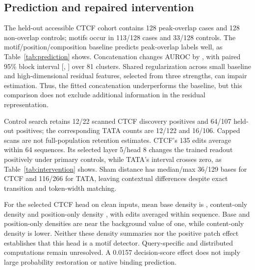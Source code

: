 \documentclass[10pt,letterpaper]{article}
\begin{document}
\subsection{Prediction and repaired intervention}
The held-out accessible CTCF cohort contains 128 peak-overlap cases and 128 non-overlap controls; motifs occur in 113/128 cases and 33/128 controls. The motif/position/composition baseline predicts peak-overlap labels well, as Table~\ref{tab:prediction} shows. Concatenation changes AUROC by \IncrementalMean{}, with paired 95\% block interval [\IncrementalLow{}, \IncrementalHigh{}] over 81 clusters. Shared regularization across small baseline and high-dimensional residual features, selected from three strengths, can impair estimation. Thus, the fitted concatenation underperforms the baseline, but this comparison does not exclude additional information in the residual representation.
\begin{table}[t]\centering\setlength{\tabcolsep}{4pt}
\caption{Accessible CTCF prediction on fixed held-out membership. Marginal sequence-bootstrap intervals condition on fitted classifiers; the paired difference uses blocks.}
\label{tab:prediction}\end{table}

Control search retains 12/22 scanned CTCF discovery positives and 64/107 held-out positives; the corresponding TATA counts are 12/122 and 16/106. Capped scans are not full-population retention estimates. CTCF's 135 edits average within 64 sequences. Its selected layer 5/head 8 changes the trained readout positively under primary controls, while TATA's interval crosses zero, as Table~\ref{tab:intervention} shows. Sham distance has median/max 36/129 bases for CTCF and 116/266 for TATA, leaving contextual differences despite exact transition and token-width matching.
\begin{table}[t]\centering\setlength{\tabcolsep}{3pt}
\caption{Fixed-head trained-readout intervention on held-out chromosomes. Effects are sequence-weighted motif-minus-sham decision-score changes; 95\% intervals and primary p-values use blocks. Indices are zero-based.}
\label{tab:intervention}\end{table}

For the selected CTCF head on clean inputs, mean base density is \SelectedBase{}, content-only density \SelectedContent{} and position-only density \SelectedPosition{}, with edits averaged within sequence. Base and position-only densities are near the background value of one, while content-only density is lower. Neither these density summaries nor the positive patch effect establishes that this head is a motif detector. Query-specific and distributed computations remain unresolved. A 0.0157 decision-score effect does not imply large probability restoration or native binding prediction.
\end{document}
